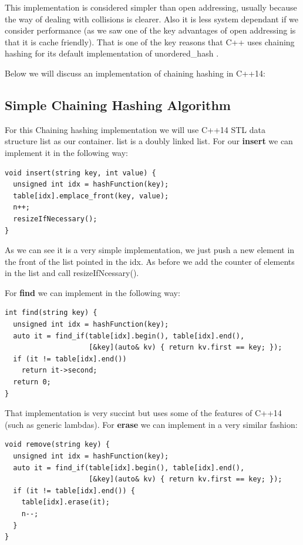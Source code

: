 This implementation is considered simpler than open addressing, usually because the way of dealing with collisions is clearer. Also it is less system dependant if we consider performance (as we saw one of the key advantages of open addressing is that it is cache friendly). That is one of the key reasons that C++ uses chaining hashing for its default implementation of unordered\_hash \cite{HashTableProposal}.

Below we will discuss an implementation of chaining hashing in C++14:

\subsection{Simple Chaining Hashing Algorithm}

For this Chaining hashing implementation we will use C++14 STL data structure list as our container. list is a doubly linked list. For our \textbf{insert} we can implement it in the following way:

\begin{lstlisting}
void insert(string key, int value) {
  unsigned int idx = hashFunction(key);      
  table[idx].emplace_front(key, value);
  n++;
  resizeIfNecessary();
}
\end{lstlisting}

As we can see it is a very simple implementation, we just push a new element in the front of the list pointed in the idx. As before we add the counter of elements in the list and call resizeIfNcessary().

For \textbf{find} we can implement in the following way:

\begin{lstlisting}
int find(string key) {
  unsigned int idx = hashFunction(key);
  auto it = find_if(table[idx].begin(), table[idx].end(),
                    [&key](auto& kv) { return kv.first == key; });
  if (it != table[idx].end())
    return it->second;
  return 0;
}
\end{lstlisting}

That implementation is very succint but uses some of the features of C++14 (such as generic lambdas). For \textbf{erase} we can implement in a very similar fashion:

\begin{lstlisting}
void remove(string key) {
  unsigned int idx = hashFunction(key);
  auto it = find_if(table[idx].begin(), table[idx].end(),
                    [&key](auto& kv) { return kv.first == key; });
  if (it != table[idx].end()) {
    table[idx].erase(it);
    n--;
  }
}
\end{lstlisting}

